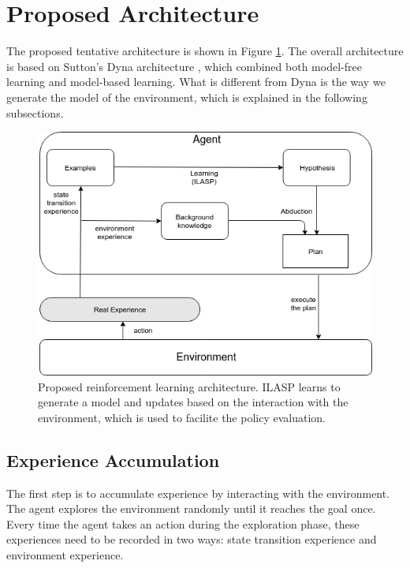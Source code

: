 \section{Proposed Architecture}
\label{proposed_architecture_section}

The proposed tentative architecture is shown in Figure \ref{proposed_architecture}. The overall architecture is based on Sutton's Dyna architecture \cite{Sutton1990}, which combined both model-free learning and model-based learning. What is different from Dyna is the way we generate the model of the environment, which is explained in the following subsections.

\begin{figure}[!htb]
\centering
\includegraphics[width=1.0\textwidth]{./figures/architecture}
\caption{Proposed reinforcement learning architecture. ILASP learns to generate a model and updates based on the interaction with the environment, which is used to facilite the policy evaluation. }
\label{proposed_architecture}
\end{figure}

\subsection{Experience Accumulation}
\label{experience_accumulation}

The first step is to accumulate experience by interacting with the environment. The agent explores the environment randomly until it reaches the goal once. 
Every time the agent takes an action during the exploration phase, these experiences need to be recorded in two ways: state transition experience and environment experience.

